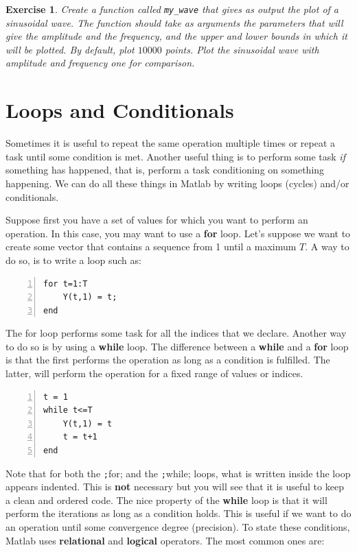\documentclass[a4paper,11pt]{article}
\newtheorem{exercise}{Exercise}
\begin{document}
\begin{exercise}
Create a function called \verb;my_wave; that gives as output the plot of a sinusoidal wave. The function should take as arguments the parameters that will give the amplitude and the frequency, and the upper and lower bounds in which it will be plotted. By default, plot $10000$ points. Plot the sinusoidal wave with amplitude and frequency one for comparison.
\end{exercise}

\section{Loops and Conditionals}

Sometimes it is useful to repeat the same operation multiple times or repeat a task until some condition is met. Another useful thing is to perform some task \textit{if} something has happened, that is, perform a task conditioning on something happening. We can do all these things in Matlab by writing loops (cycles) and/or conditionals.

Suppose first you have a set of values for which you want to perform an operation. In this case, you may want to use a \textbf{for} loop. Let's suppose we want to create some vector that contains a sequence from 1 until a maximum $T$. A way to do so, is to write a loop such as:

\begin{Verbatim}[numbers=left]
for t=1:T
	Y(t,1) = t;
end
\end{Verbatim}

The for loop performs some task for all the indices that we declare. Another way to do so is by using a \textbf{while} loop. The difference between a \textbf{while} and a \textbf{for} loop is that the first performs the operation as long as a condition is fulfilled. The latter, will perform the operation for a fixed range of values or indices.

\begin{Verbatim}[numbers=left]
t = 1
while t<=T
	Y(t,1) = t
 	t = t+1
end
\end{Verbatim}

Note that for both the \texttt;for; and the \texttt;while; loops, what is written inside the loop appears indented. This is \textbf{not} necessary but you will see that it is useful to keep a clean and ordered code. The nice property of the \textbf{while} loop is that it will perform the iterations as long as a condition holds. This is useful if we want to do an operation until some convergence degree (precision). To state these conditions, Matlab uses \textbf{relational} and \textbf{logical} operators. The most common ones are:
\end{document}
